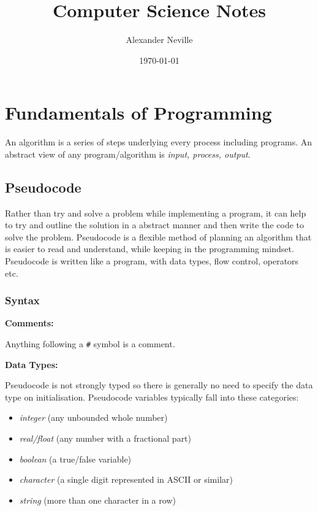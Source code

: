 \documentclass[10pt]{article}
\author{Alexander Neville}
\date{\today}
\title{Computer Science Notes}
\let\oldsection\section
\renewcommand\section{\clearpage\oldsection}
\begin{document}
\maketitle
\thispagestyle{empty}
\begin{figure}[H]
\centering
\end{figure}
\newpage
\def\a{3.0}
\def\b{5.0}
\def\dx{0.8}
\def\dy{0.5}
\def\lx{1.0}
\def\ly{1.0}
\def\dr{0.02}

\thispagestyle{empty}
\newpage
\tableofcontents

\section{Fundamentals of Programming}
\label{sec:org30f6e9c}

An algorithm is a series of steps underlying every process including programs. An abstract view of any program/algorithm is \emph{input, process, output}.

\subsection{Pseudocode}
\label{sec:org6286a8b}

Rather than try and solve a problem while implementing a program, it can help to try and outline the solution in a abstract manner and then write the code to solve the problem. Pseudocode is a flexible method of planning an algorithm that is easier to read and understand, while keeping in the programming mindset. Pseudocode is written like a program, with data types, flow control, operators etc.

\subsubsection{Syntax}
\label{sec:orgdf25282}

\textbf{Comments:}

Anything following a \texttt{\#} symbol is a comment.

\textbf{Data Types:}

Pseudocode is not strongly typed so there is generally no need to specify the data type on initialisation. Pseudocode variables typically fall into these categories:

\begin{itemize}
\item \emph{integer} (any unbounded whole number)
\item \emph{real/float} (any number with a fractional part)
\item \emph{boolean} (a true/false variable)
\item \emph{character} (a single digit represented in ASCII or similar)
\item \emph{string} (more than one character in a row)
\end{itemize}
\end{document}
